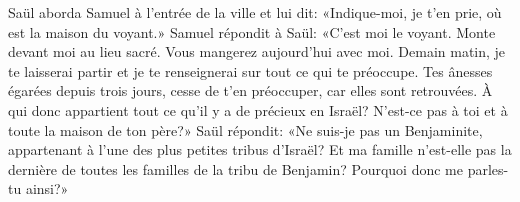 Saül aborda Samuel à l’entrée de la ville et lui dit:
	«Indique-moi, je t’en prie, où est la maison du voyant.»
Samuel répondit à Saül: «C’est moi le voyant.
Monte devant moi au lieu sacré.
	Vous mangerez aujourd’hui avec moi.
Demain matin, je te laisserai partir et je te renseignerai sur tout ce qui te préoccupe.
Tes ânesses égarées depuis trois jours,
	cesse de t’en préoccuper, car elles sont retrouvées.
À qui donc appartient tout ce qu’il y a de précieux en Israël?
N’est-ce pas à toi et à toute la maison de ton père?»
Saül répondit: «Ne suis-je pas un Benjaminite,
	appartenant à l’une des plus petites tribus d’Israël?
Et ma famille n’est-elle pas la dernière de toutes les familles de la tribu de Benjamin?
Pourquoi donc me parles-tu ainsi?»
